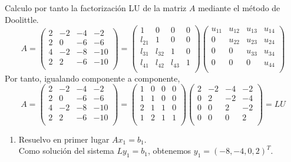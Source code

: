 \begin{ejercicio}
    Calculo por tanto la factorización LU de la matriz $A$ mediante el método de Doolittle.
    \begin{equation*}
        A = \left( \begin{array}{cccc}
            2 & -2 & -4 & -2 \\
            2 & 0 & -6 & -6 \\
            4 & -2 & -8 & -10 \\
            2 & 2 & -6 & -10 \\
        \end{array}\right)
        = \left( \begin{array}{cccc}
            1 & 0 & 0 & 0 \\
            l_{21} & 1 & 0 & 0 \\
            l_{31} & l_{32} & 1 & 0 \\
            l_{41} & l_{42} & l_{43} & 1 \\
        \end{array}\right)
        \left( \begin{array}{cccc}
            u_{11} & u_{12} & u_{13} & u_{14} \\
            0 & u_{22} & u_{23} & u_{24} \\
            0 & 0 & u_{33} & u_{34} \\
            0 & 0 & 0 & u_{44} \\
        \end{array}\right)
    \end{equation*}
    Por tanto, igualando componente a componente,
    \begin{equation*}
        A = \left( \begin{array}{cccc}
            2 & -2 & -4 & -2 \\
            2 & 0 & -6 & -6 \\
            4 & -2 & -8 & -10 \\
            2 & 2 & -6 & -10 \\
        \end{array}\right)
        = \left( \begin{array}{cccc}
            1 & 0 & 0 & 0 \\
            1 & 1 & 0 & 0 \\
            2 & 1 & 1 & 0 \\
            1 & 2 & 1 & 1 \\
        \end{array}\right)
        \left( \begin{array}{cccc}
            2 & -2 & -4 & -2 \\
            0 & 2 & -2 & -4 \\
            0 & 0 & 2 & -2 \\
            0 & 0 & 0 & 2 \\
        \end{array}\right) = LU
    \end{equation*}
    \begin{enumerate}
        \item Resuelvo en primer lugar $Ax_1 = b_1$.\\
        Como solución del sistema $Ly_1 = b_1$, obtenemos $y_1 = (-8, -4, 0, 2)^T$.


\end{enumerate}
\end{ejercicio}
